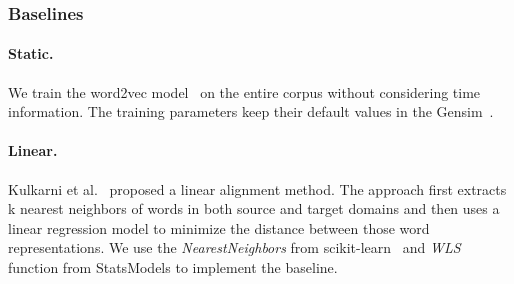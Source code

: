 \begin{table}[htp]
\centering
{}
\caption{Data stats across each temporal and the general domain, where $\#doc$ is the number of documents, $\#uw$ refers to the unique numbers of words in the domain and $\#awpd$ means the average number of words per document.}
\label{chap3:tab:dweEvalData}
\end{table}


\subsubsection{Baselines}
\label{chap3:subsec:dweBaselines}


\paragraph{Static.} 
We train the word2vec model~\cite{mikolov2013distributed} on the entire corpus without considering time information.
The training parameters keep their default values in the Gensim~\cite{rehurek2010software}.

\paragraph{Linear.} 
Kulkarni et al.~\cite{kulkarni2015statistically} proposed a linear alignment method. The approach first extracts k nearest neighbors of words in both source and target domains and then uses a linear regression model to minimize the distance between those word representations. We use the \textit{NearestNeighbors} from scikit-learn~\cite{pedregosa2011scikit} and \textit{WLS} function from StatsModels to implement the baseline.

